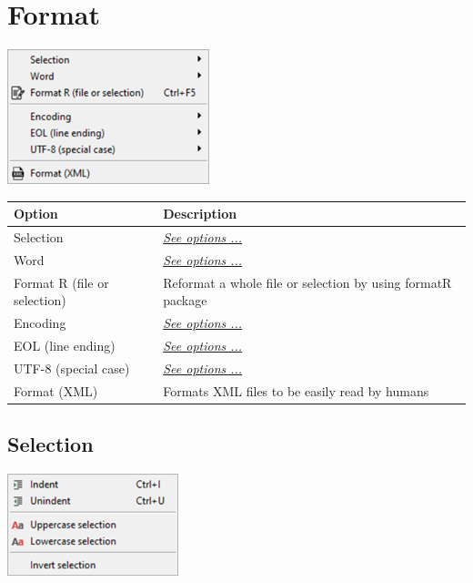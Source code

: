 
\hypertarget{menu_format}{}
\section{Format}

\includegraphics[scale=0.50]{./res/menu_format.png}\\

\begin{scriptsize}
  \begin{tabularx}{\textwidth}{>{\hsize=0.3\hsize}X>{\hsize=0.7\hsize}X}\\
    \hline
    \textbf{Option} & \textbf{Description} \\
    \hline
    Selection & \textit{\href{\#menu\_format\_selection}{See options ...}} \\
    Word & \textit{\href{\#menu\_format\_word}{See options ...}} \\
    Format R (file or selection) & Reformat a whole file or selection by using formatR package \\
    \hdashline[1pt/1pt]
    Encoding & \textit{\href{\#menu\_format\_encoding}{See options ...}} \\
    EOL (line ending) & \textit{\href{\#menu\_format\_eol}{See options ...}} \\
    UTF-8 (special case) & \textit{\href{\#menu\_format\_utf8}{See options ...}} \\
    \hdashline[1pt/1pt]
    Format (XML) & Formats XML files to be easily read by humans \\
    \hline
  \end{tabularx}
\end{scriptsize}


\hypertarget{menu_format_selection}{}
\subsection{Selection}

\includegraphics[scale=0.50]{./res/menu_format_selection.png}\\

